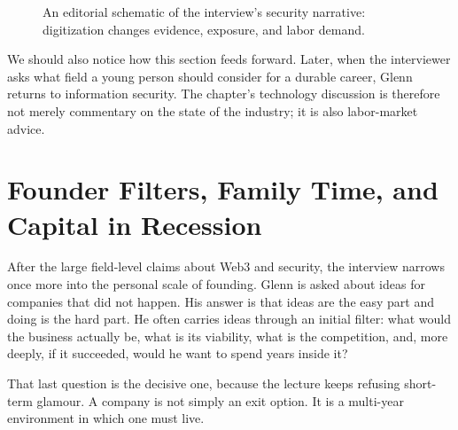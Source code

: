 \begin{figure}[h]
\centering
{}
\caption{An editorial schematic of the interview's security narrative: digitization changes evidence, exposure, and labor demand.}
\end{figure}

We should also notice how this section feeds forward. Later, when the interviewer asks what field a young person should consider for a durable career, Glenn returns to information security. The chapter's technology discussion is therefore not merely commentary on the state of the industry; it is also labor-market advice.

\section{Founder Filters, Family Time, and Capital in Recession}

After the large field-level claims about Web3 and security, the interview narrows once more into the personal scale of founding. Glenn is asked about ideas for companies that did not happen. His answer is that ideas are the easy part and doing is the hard part. He often carries ideas through an initial filter: what would the business actually be, what is its viability, what is the competition, and, more deeply, if it succeeded, would he want to spend years inside it?

That last question is the decisive one, because the lecture keeps refusing short-term glamour. A company is not simply an exit option. It is a multi-year environment in which one must live.

